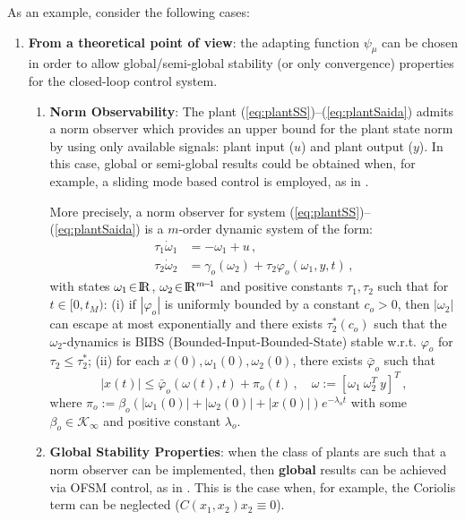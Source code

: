 \documentclass[letterpaper, 10 pt, conference]{ieeeconf}  %
\def\re{{\rm I}\! {\rm R}}
\theoremstyle{plain}
\theoremstyle{definition}
\theoremstyle{remark}
\begin{document}
As an example, consider the following cases:
%
\begin{enumerate}

\item {\bf From a theoretical point of view}: the adapting function $\psi_\mu$ can be chosen in order to allow global/semi-global stability (or only convergence) properties for the closed-loop control system. 

\begin{enumerate}

\item {\bf Norm Observability}: The plant
(\ref{eq:plantSS})--(\ref{eq:plantSaida}) admits a norm observer which provides an upper bound for the plant state norm by using only  available signals: plant input ($u$) and plant output ($y$). In this case, global or semi-global results could be obtained when, for example, a sliding mode based control is employed, as in \cite{POH:2011}.  


More precisely, a norm observer for system
(\ref{eq:plantSS})--(\ref{eq:plantSaida})  is a $m$-order
dynamic system of the form:
%
\begin{align}
\tau_1 \dot{\omega}_1 &= -\omega_1+u\,, \label{eq:defuav} \\
\tau_2 \dot{\omega}_2 &=
\gamma_o(\omega_2)+\tau_2\varphi_o(\omega_1,y,t)\,,\label{eq:normobsgeneric}
\end{align}
%
with states $\omega_1\!\in\!\re$, $\omega_2\!\in\!\re^{m\!-\!1}$ and
positive constants $\tau_1, \tau_2$ such that for $t\in[0,t_M)$: (i)
if $|\varphi_o|$ is uniformly bounded by a constant $c_o\!>\!0$,
then $|\omega_2|$ can escape at most exponentially and there exists
$\tau_2^*(c_o)$ such that the $\omega_2$-dynamics is BIBS
(Bounded-Input-Bounded-State) stable w.r.t. $\varphi_o$ for
$\tau_2\leq \tau_2^*$; (ii)
for each $x(0),\omega_1(0),\omega_2(0)$, there exists $\bar{\varphi}_o$ such that
%
\begin{equation}
|x(t)| \leq \bar{\varphi}_o(\omega(t),t) + \pi_o(t) \,, \quad
\omega:=[\omega_1 \ \omega_2^T \ y]^T\,,\label{eq:xboundfromw}
\end{equation}
%
where
$\pi_o:=\beta_o(|\omega_1(0)|\!+\!|\omega_2(0)|\!+\!|x(0)|)e^{-\lambda_o
t}$ with some $\beta_o \in \mathcal{K}_\infty$ and positive
constant $\lambda_o$.

\item {\bf Global Stability Properties}: when the class of plants are such that a norm observer can be implemented, then {\bf global} results can be achieved via OFSM control, as in \cite{POH:2011}. This is the case  when, for example, the Coriolis term can be neglected ($C(x_1,x_2) x_2 \equiv 0$).



\end{enumerate}
\end{enumerate}
\end{document}
